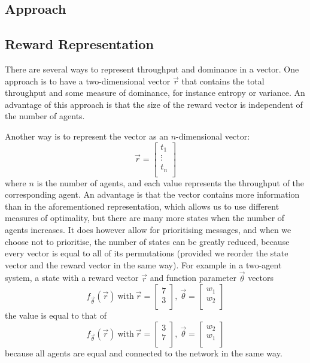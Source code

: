 \documentclass{article}
\begin{document}
\begin{multicols}{2}
	\section{Approach}
	\label{sec:approach}

		\subsection{Reward Representation}
		\label{sub:reward_representation}
		There are several ways to represent throughput and dominance in a vector.
		One approach is to have a two-dimensional vector $\vec{r}$ that contains
		the total throughput and some measure of dominance, for instance entropy
		or variance. An advantage of this approach is that the size of the reward
		vector is independent of the number of agents.

		Another way is to represent the vector as an $n$-dimensional vector:
		$$\vec{r} = \begin{bmatrix}
			t_1\\
			\vdots\\
			t_n\\
		\end{bmatrix}$$
		where $n$ is the number of agents, and each value represents the
		throughput of the corresponding agent. An advantage is that the vector
		contains more information than in the aforementioned representation,
		which allows us to use different measures of optimality, but
		there are many more states when the number of agents increases. It does
		however allow for prioritising messages, and when we choose not to
		prioritise, the number of states can be greatly reduced, because every
		vector is equal to all of its permutations (provided we reorder the state
		vector and the reward vector in the same way).
		For example in a two-agent system, a state with a reward vector $\vec{r}$
		and function parameter $\vec{\theta}$
		vectors
		$$ f_{\vec{\theta}}(\vec{r})~\textrm{with}~\vec{r} = \begin{bmatrix}
			7\\
			3\\
		\end{bmatrix},~
		\vec{\theta} = \begin{bmatrix}
			w_1\\
			w_2\\
		\end{bmatrix}$$
		the value is equal to that of
		$$ f_{\vec{\theta}}(\vec{r})~\textrm{with}~\vec{r} = \begin{bmatrix}
			3\\
			7\\
		\end{bmatrix},~
		\vec{\theta} = \begin{bmatrix}
			w_2\\
			w_1\\
		\end{bmatrix}$$
		because all agents are equal and connected to the network in the same
		way.


\end{multicols}
\end{document}
